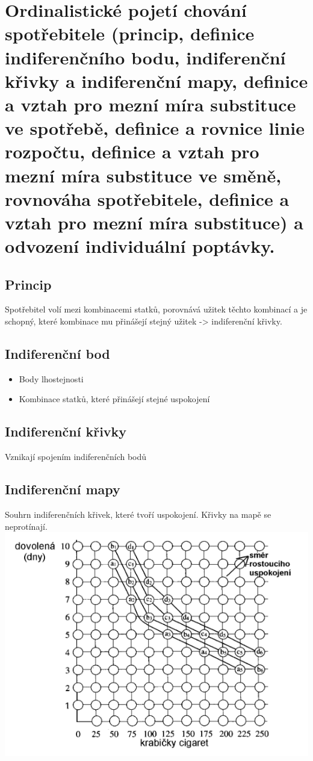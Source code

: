 \clearpage
\section{Ordinalistické pojetí chování spotřebitele (princip, definice indiferenčního bodu,
indiferenční křivky a indiferenční mapy, definice a vztah pro mezní míra substituce ve
spotřebě, definice a rovnice linie rozpočtu, definice a vztah pro mezní míra substituce
ve směně, rovnováha spotřebitele, definice a vztah pro mezní míra substituce) a
odvození individuální poptávky.}

\subsection{Princip}
Spotřebitel volí mezi kombinacemi statků, porovnává užitek těchto kombinací a je schopný, které kombinace mu přinášejí stejný užitek -> indiferenční křivky.

\subsection{Indiferenční bod}
\begin{itemize}
    \item Body lhostejnosti
    \item Kombinace statků, které přinášejí stejné uspokojení
\end{itemize}

\subsection{Indiferenční křivky}
Vznikají spojením indiferenčních bodů

\subsection{Indiferenční mapy}
Souhrn indiferenčních křivek, které tvoří  uspokojení. Křivky na mapě se neprotínají. \\
\includegraphics[width=16cm]{images/indif_mapa.png}

